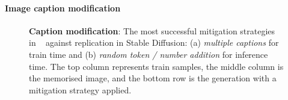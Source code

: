 \documentclass[conference,table]{IEEEtran} %
\begin{document}
\paragraph{Image caption modification}\label{sec:mitigation-sanitising-caption} %
\begin{figure}
    \centering
\hspace*{\fill}
    \hfill
        \hspace*{\fill}
    \caption{\textbf{Caption modification}: The most successful mitigation strategies in ~\cite{somepalli_understanding_2023} against replication in Stable Diffusion: (a) \textit{multiple captions} for train time and (b) \textit{random token / number addition} for inference time. The top column represents train samples, the middle column is the memorised image, and the bottom row is the generation with a mitigation strategy applied.}
    \label{fig:caption-modification}
\end{figure}
\end{document}
